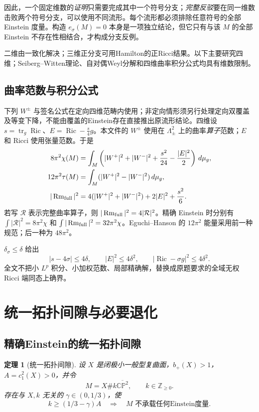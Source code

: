 \documentclass[UTF8,a4paper,11pt,fontset=fandol]{ctexart}
\numberwithin{equation}{section}
\newtheorem{theorem}{定理}[section]
\theoremstyle{definition}
\newcommand{\Ric}{\operatorname{Ric}}
\newcommand{\Rm}{\operatorname{Rm}}
\newcommand{\tr}{\operatorname{tr}}
\newcommand{\CP}{\mathbb{CP}}
\newcommand{\Z}{\mathbb Z}
\newcommand{\dd}{\,d\mu_g}
\begin{document}
因此，一个固定维数的\emph{证明}只需要完成其中一个符号分支；\emph{完整反驳}要在同一维数击败两个符号分支，可以使用不同流形。每个流形都必须排除任意符号的全部 Einstein 度量。构造 $e_\sigma(M)=0$ 本身是一项独立结论，但它只有与该 $M$ 的全部 Einstein 不存在性相结合，才构成分支反例。

二维由一致化解决；三维正分支可用Hamilton的正Ricci结果。以下主要研究四维；Seiberg--Witten理论、自对偶Weyl分解和四维曲率积分公式均具有维数限制。

\subsection{曲率范数与积分公式}
下列 $W^\pm$ 与签名公式在定向四维范畴内使用；非定向情形须另行处理定向双覆盖及等变下降，不能由覆盖的Einstein存在直接推出原流形结论。四维设 $s=\tr_g\Ric$、$E=\Ric-\frac{s}{4}g$。本文件的 $W^\pm$ 使用在 $\Lambda^2_\pm$ 上的曲率\emph{算子}范数；$E$ 和 Ricci 使用张量范数。于是
\begin{align}
8\pi^2\chi(M)&=\int_M\left(|W^+|^2+|W^-|^2+\frac{s^2}{24}-\frac{|E|^2}{2}\right)\dd,\label{eq:CGB}\\
12\pi^2\tau(M)&=\int_M(|W^+|^2-|W^-|^2)\dd,\label{eq:signature}\\
|\Rm_{\rm full}|^2&=4(|W^+|^2+|W^-|^2)+2|E|^2+\frac{s^2}{6}.
\end{align}
若写 $\mathcal R$ 表示完整曲率算子，则 $|\Rm_{\rm full}|^2=4|\mathcal R|^2$。精确 Einstein 时分别有 $\int|\mathcal R|^2=8\pi^2\chi$ 和 $\int|\Rm_{\rm full}|^2=32\pi^2\chi$。Eguchi--Hanson 的 $12\pi^2$ 能量采用前一种规范；后一种为 $48\pi^2$。

$\delta_\sigma\le\delta$ 给出
\begin{equation}
 |s-4\sigma|\le4\delta,\qquad |E|^2\le4\delta^2,\qquad
 |\Ric-\sigma g|^2\le4\delta^2.
\end{equation}
全文不把小 $L^p$ 积分、小加权范数、局部精确解，替换成原题要求的全域无权 Ricci 端同态上确界。

\section{统一拓扑间隙与必要退化}
\subsection{精确Einstein的统一拓扑间隙}
\begin{theorem}[统一拓扑间隙]\label{thm:topgap}
设 $X$ 是闭极小一般型复曲面，$b_+(X)>1$，$A=c_1^2(X)>0$，并令
\[
M=X\#k\overline{\CP^2},\qquad k\in\Z_{\ge0}.
\]
存在与 $X,k$ 无关的 $\gamma\in(0,1/3)$，使
\begin{equation}\label{eq:topgap}
 k\ge(1/3-\gamma)A\quad\Longrightarrow\quad
 M\text{ 不承载任何Einstein度量}.
\end{equation}
\end{theorem}
\end{document}
